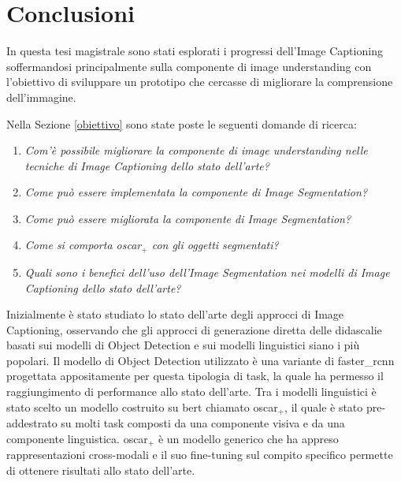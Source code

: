 \chapter{Conclusioni}
In questa tesi magistrale sono stati esplorati i progressi dell'Image Captioning soffermandosi principalmente sulla componente di image understanding con l'obiettivo di sviluppare un prototipo che cercasse di migliorare la comprensione dell'immagine.


Nella Sezione \ref{obiettivo} sono state poste le seguenti domande di ricerca:
\begin{enumerate}[leftmargin=1.5cm,label=\textit{RQ\arabic*:},ref=\textit{RQ\arabic*}]
    \item\label{rq_1}\textit{Com'è possibile migliorare la componente di image understanding nelle tecniche di Image Captioning dello stato dell'arte?}
    \item\label{rq_2}\textit{Come può essere implementata la componente di Image Segmentation?}
    \item\label{rq_3}\textit{Come può essere migliorata la componente di Image Segmentation?}
    \item\label{rq_4}\textit{Come si comporta \acrshort{oscar}$_+$ con gli oggetti segmentati?}
    \item\label{rq_5}\textit{Quali sono i benefici dell'uso dell'Image Segmentation nei modelli di Image Captioning dello stato dell'arte?}
\end{enumerate}


Inizialmente è stato studiato lo stato dell'arte degli approcci di Image Captioning, osservando che gli approcci di generazione diretta delle didascalie basati sui modelli di Object Detection e sui modelli linguistici siano i più popolari. Il modello di Object Detection utilizzato è una variante di \acrshort{faster_rcnn} progettata appositamente per questa tipologia di task, la quale ha permesso il raggiungimento di performance allo stato dell'arte.
Tra i modelli linguistici è stato scelto un modello costruito su \acrshort{bert} chiamato \acrshort{oscar}$_+$, il quale è stato pre-addestrato su molti task composti da una componente visiva e da una componente linguistica. \acrshort{oscar}$_+$ è un modello generico che ha appreso rappresentazioni cross-modali e il suo fine-tuning sul compito specifico permette di ottenere risultati allo stato dell'arte.



